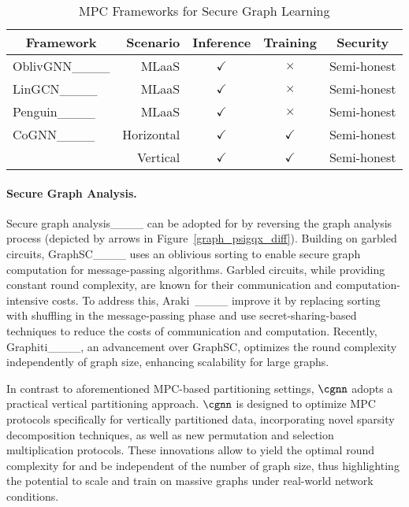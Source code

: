 \begin{table}[!t]
\centering
\caption{MPC Frameworks for Secure Graph Learning}
\setlength\tabcolsep{2pt}
\begin{tabular}{|l|r|c|c|c|}
\hline
\multicolumn{1}{|c|}{\textbf{Framework}} & \textbf{Scenario} & \textbf{Inference} & \textbf{Training} & \textbf{Security} 
\\ \hline\hline
 OblivGNN____	 	 & MLaaS	 & $\checkmark$ 	 & $\times$	 & Semi-honest  \\\hline
LinGCN____ 	 & MLaaS	 & $\checkmark$ 	 & $\times$	 & Semi-honest  \\\hline
Penguin____ 	 & MLaaS	 & $\checkmark$ 	 & $\times$	 & Semi-honest  \\\hline
 CoGNN____ 	 & Horizontal 	 & $\checkmark$ 	 & $\checkmark$ & Semi-honest\\\hline
\cgnn 	 	 & Vertical	 	 & $\checkmark$ 	 	 & $\checkmark$ 	 & Semi-honest 	 \\
\hline
\end{tabular}
\label{tab:compare_sec_graph}
\end{table}


\paragraph{Secure Graph Analysis.} 
Secure graph analysis____ can be adopted for \osmm by reversing the graph analysis process (depicted by arrows in Figure~\ref{graph_psigqx_diff}).
Building on  garbled circuits, GraphSC____ uses an oblivious sorting to enable secure graph computation for message-passing algorithms.
Garbled circuits, while providing constant round complexity, are known for their communication and computation-intensive costs.
To address this, Araki~\etal____ improve it by replacing sorting with  shuffling in the message-passing phase %
and use secret-sharing-based techniques to reduce the costs of communication and computation.
Recently,  Graphiti____, an advancement over GraphSC, optimizes the round complexity independently of graph size, enhancing scalability for large graphs.

In contrast to aforementioned MPC-based partitioning settings, $\cgnn$ adopts a practical vertical partitioning approach.
$\cgnn$ is designed to optimize MPC protocols specifically for vertically partitioned data, incorporating novel sparsity decomposition techniques, as well as new permutation and selection multiplication protocols. 
These innovations allow \cgnn to yield the optimal round complexity  for \osmm and be independent of the number of graph size, thus highlighting the potential  to scale and train on massive graphs under real-world network conditions.

